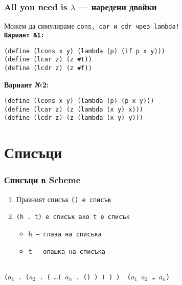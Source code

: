 \documentclass[alsotrans]{beamerswitch}
\begin{document}
\begin{frame}[fragile]
  \frametitle{All you need is $\lambda$ --- наредени двойки}

  Можем да симулираме \tt{cons}, \tt{car} и \tt{cdr} чрез \tt{lambda}!\\[2ex]
  \pause
  \textbf{Вариант №1:}
\begin{lstlisting}
(define (lcons x y) (lambda (p) (if p x y)))
(define (lcar z) (z #t))
(define (lcdr z) (z #f))
\end{lstlisting}
  \pause
  \textbf{Вариант №2:}
\begin{lstlisting}
(define (lcons x y) (lambda (p) (p x y)))
(define (lcar z) (z (lambda (x y) x)))
(define (lcdr z) (z (lambda (x y) y)))
\end{lstlisting}
\end{frame}

\section{Списъци}

\begin{frame}
  \frametitle{Списъци в Scheme}

  \begin{definition}
    \begin{enumerate}
    \item Празният списък \tt{()} е списък
    \item \tt{(h . t)} е списък ако \tt t е списък
      \begin{itemize}
      \item \tt h --- глава на списъка
      \item \tt t --- опашка на списъка
      \end{itemize}
    \end{enumerate}
  \end{definition}
  \vspace{4ex}
  \pause
  \\[3ex]
  \tt{($a_1$ . ($a_2$ . ( \ldots ( $a_n$ . () ) ) ) ) \eqv\ ($a_1$ $a_2$ \ldots\ $a_n$)}
\end{frame}
\end{document}
